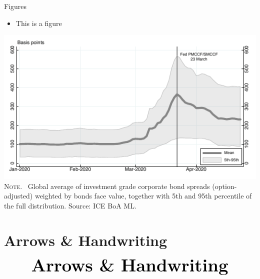\documentclass[10pt]{beamer}
\begin{document}
\begin{frame}
	{Figures}
	\begin{itemize}
		\item This is a figure
	\end{itemize}
	\begin{center}
		\begin{minipage}[b]{.6\textwidth}
			\includegraphics[width=\textwidth]{Figure.pdf}\\
			\tiny{{\scshape Note}. \ Global average of investment grade corporate bond spreads (option-adjusted) weighted by bonds face value, together with 5th and 95th percentile of the full distribution. Source: ICE BoA ML.}
		\end{minipage}
	\end{center}
\end{frame}



\section{Arrows \& Handwriting}
\begin{frame}
	\begin{eqnarray*}
		&\text{{\Huge \textbf{Arrows \& Handwriting}}}\\
	\end{eqnarray*}
\end{frame}

\end{document}
